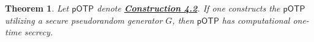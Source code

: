 \documentclass[12pt,openany]{book}
\newtheorem{theorem}{Theorem}[chapter]
\theoremstyle{definition}
\newcommand{\potp}{\mathsf{pOTP}}
\begin{document}
%		
%		
%		
%		
\newpage
\begin{tcolorbox}[colback=white,colframe=thmcolor,arc=5pt,title={\color{white}\bf }]
	\begin{theorem}
		Let $\potp$ denote \hyperlink{con4.2}{\textbf{Construction 4.2}}.  If one constructs the $\potp$ utilizing a secure pseudorandom generator $G$, then $\potp$ has computational one-time secrecy.
	\end{theorem}
\end{tcolorbox}
\end{document}
